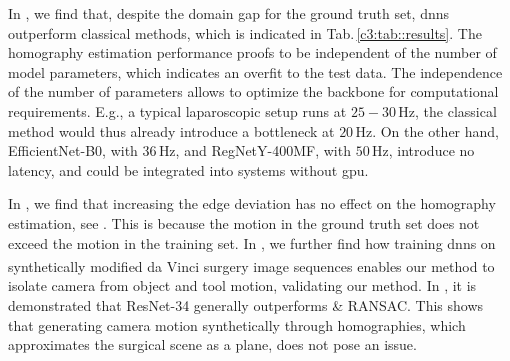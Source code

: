 In , we find that, despite the domain gap for the ground truth set, \gls{dnn}s outperform classical methods, which is indicated in Tab.\,\ref{c3:tab::results}. The homography estimation performance proofs to be independent of the number of model parameters, which indicates an overfit to the test data. The independence of the number of parameters allows to optimize the backbone for computational requirements. E.g., a typical laparoscopic setup runs at $25-30\,\text{Hz}$, the classical method would thus already introduce a bottleneck at $20\,\text{Hz}$. On the other hand, EfficientNet-B0, with $36\,\text{Hz}$, and RegNetY-400MF, with $50\,\text{Hz}$, introduce no latency, and could be integrated into systems without \gls{gpu}.


In , we find that increasing the edge deviation has no effect on the homography estimation, see . This is because the motion in the ground truth set does not exceed the motion in the training set. In , we further find how training \gls{dnn}s on synthetically modified da Vinci\textsuperscript{\textregistered} surgery image sequences enables our method to isolate camera from object and tool motion, validating our method. In , it is demonstrated that ResNet-34 generally outperforms  \& RANSAC. This shows that generating camera motion synthetically through homographies, which approximates the surgical scene as a plane, does not pose an issue.

